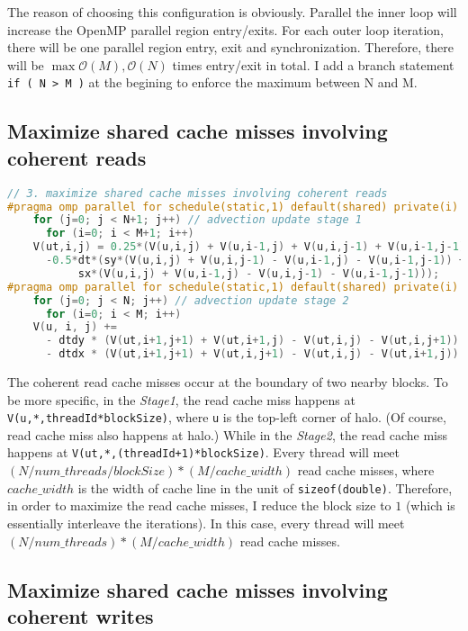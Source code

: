 The reason of choosing this configuration is obviously. 
Parallel the inner loop will increase the OpenMP parallel region entry/exits.
For each outer loop iteration, there will be one parallel region entry, exit and synchronization.
Therefore, there will be $\max{\mathcal{O}(M),\mathcal{O}(N)}$ times entry/exit in total.
I add a branch statement \lstinline{if ( N > M )} at the begining to enforce the maximum between N and M.


\subsection{Maximize shared cache misses involving coherent reads}

\begin{lstlisting}[language=c]
// 3. maximize shared cache misses involving coherent reads
#pragma omp parallel for schedule(static,1) default(shared) private(i)
    for (j=0; j < N+1; j++) // advection update stage 1
      for (i=0; i < M+1; i++) 
	V(ut,i,j) = 0.25*(V(u,i,j) + V(u,i-1,j) + V(u,i,j-1) + V(u,i-1,j-1))
	  -0.5*dt*(sy*(V(u,i,j) + V(u,i,j-1) - V(u,i-1,j) - V(u,i-1,j-1)) +
		   sx*(V(u,i,j) + V(u,i-1,j) - V(u,i,j-1) - V(u,i-1,j-1)));
#pragma omp parallel for schedule(static,1) default(shared) private(i)
    for (j=0; j < N; j++) // advection update stage 2
      for (i=0; i < M; i++) 
	V(u, i, j) +=
	  - dtdy * (V(ut,i+1,j+1) + V(ut,i+1,j) - V(ut,i,j) - V(ut,i,j+1))
	  - dtdx * (V(ut,i+1,j+1) + V(ut,i,j+1) - V(ut,i,j) - V(ut,i+1,j));
\end{lstlisting}

The coherent read cache misses occur at the boundary of two nearby blocks.
To be more specific, in the \textit{Stage1}, the read cache miss happens at \lstinline{V(u,*,threadId*blockSize)}, where \lstinline{u} is the top-left corner of halo. (Of course, read cache miss also happens at halo.)
While in the \textit{Stage2}, the read cache miss happens at 
\lstinline{V(ut,*,(threadId+1)*blockSize)}.
Every thread will meet $(N/num\_threads/blockSize)*(M/cache\_width)$ read cache misses, where $cache\_width$ is the width of cache line in the unit of \lstinline{sizeof(double)}.
Therefore, in order to maximize the read cache misses, I reduce the block size to $1$ (which is essentially interleave the iterations). 
In this case, every thread will meet $(N/num\_threads)*(M/cache\_width)$ read cache misses.

\subsection{Maximize shared cache misses involving coherent writes}

